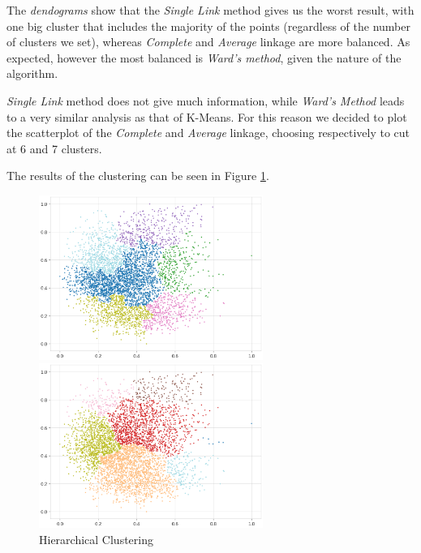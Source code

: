\documentclass[a4paper,11pt,dvipsnames]{article}
\begin{document}
The \textit{dendograms} show that the \textit{Single Link} method gives us the worst result, with one big cluster that includes the majority of the points (regardless of the number of clusters we set), whereas \textit{Complete} and \textit{Average} linkage are more balanced. As expected, however the most balanced is \textit{Ward's method}, given the nature of the algorithm. 
 
 \textit{Single Link} method does not give much information, while \textit{Ward's Method} leads to a very similar analysis as that of K-Means. For this reason we decided to plot the scatterplot of the \textit{Complete} and \textit{Average} linkage, choosing respectively to cut at 6 and 7 clusters.
 
 The results of the clustering can be seen in Figure \ref{fig:hierach}.
 
\begin{figure}[h]
    \centering
    \begin{minipage}{0.49\textwidth}
    \centering
        \includegraphics[width=0.65\textwidth]{complete.png}
    \end{minipage}
    \hfill
        \begin{minipage}{0.49\textwidth}
        \centering
        \includegraphics[width=0.65\textwidth]{average.png}
    \end{minipage}
    \caption{Hierarchical Clustering}
    \label{fig:hierach}
\end{figure}
\end{document}
